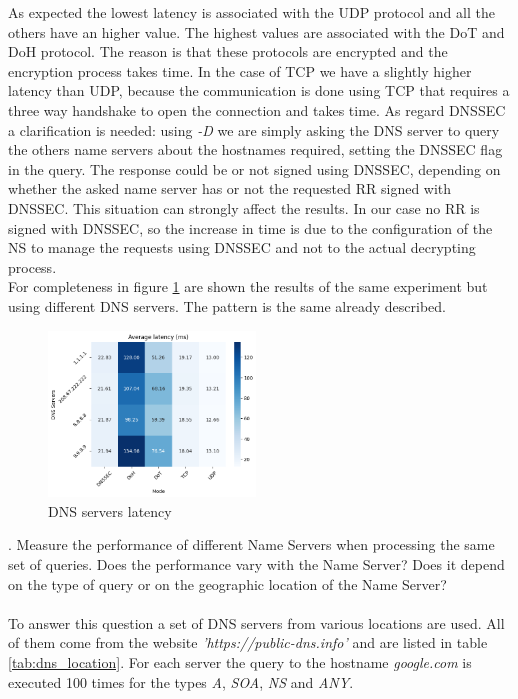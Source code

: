 \documentclass[a4paper,10pt]{article}
\begin{document}
\begin{multicols}{2}
\noindent
As expected the lowest latency is associated with the UDP protocol and all the others have an higher value. The highest values are associated with the DoT and DoH protocol. The reason is that
these protocols are encrypted and the encryption process takes time. In the case of TCP we have a slightly higher latency than UDP, because the communication is done using TCP
that requires a three way handshake to open the connection and takes time. As regard DNSSEC a clarification is needed: 
using \textit{-D} we are simply asking the DNS server to query the others name servers about the hostnames required, setting the DNSSEC flag in the query. The response
could be or not signed using DNSSEC, depending on whether the asked name server has or not the requested RR signed with DNSSEC. This situation can strongly affect the results. 
In our case no RR is signed with DNSSEC, so the increase in time is due to the configuration of the NS to manage the requests using DNSSEC and not to the actual decrypting process.\\
For completeness in figure \ref{fig:all_latency} are shown the results of the same experiment but using different DNS servers. The pattern is the same already described.\\

        \begin{figure}[H]
                \centering
                \includegraphics[width = 0.49\textwidth]{all_latency.png}
                \caption{\small DNS servers latency}
                \label{fig:all_latency}
        \end{figure}

. Measure the performance of different Name Servers when processing the same set of queries. Does the performance vary with the Name Server? Does it depend on the type of query or on the geographic 
location of the Name Server?\\
\\
To answer this question a set of DNS servers from various locations are used. All of them come from the website \textit{'https://public-dns.info'} and are listed in table \ref{tab:dns_location}. 
For each server the query to the hostname \textit{google.com} is executed 100 times for the types \textit{A}, \textit{SOA}, \textit{NS} and \textit{ANY}.


\end{multicols}
\end{document}
